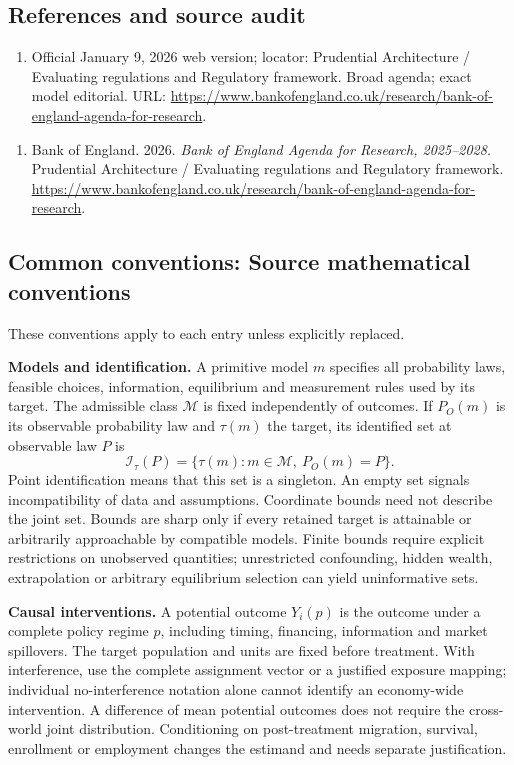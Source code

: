 \documentclass[11pt,a4paper]{article}
\begin{document}
\subsection*{References and source audit}
\begin{enumerate}
\item Official January 9, 2026 web version; locator: Prudential Architecture / Evaluating regulations and Regulatory framework. Broad agenda; exact model editorial. URL: \url{https://www.bankofengland.co.uk/research/bank-of-england-agenda-for-research}.
\end{enumerate}
\begin{enumerate}\raggedright
\item\hypertarget{definitions:source:30007602:1}{} Bank of England. 2026. \emph{Bank of England Agenda for Research, 2025–2028}. Prudential Architecture / Evaluating regulations and Regulatory framework.
\url{https://www.bankofengland.co.uk/research/bank-of-england-agenda-for-research}.
\end{enumerate}

\subsection*{Common conventions: Source mathematical conventions}

These conventions apply to each entry unless explicitly replaced.

\textbf{Models and identification.} A primitive model \(m\) specifies all probability laws, feasible choices, information, equilibrium and measurement rules used by its target. The admissible class \(\mathcal M\) is fixed independently of outcomes. If \(P_O(m)\) is its observable probability law and \(\tau(m)\) the target, its identified set at observable law \(P\) is
\[
 \mathcal I_\tau(P)=\{\tau(m):m\in\mathcal M,\ P_O(m)=P\}.
\]
Point identification means that this set is a singleton. An empty set signals incompatibility of data and assumptions. Coordinate bounds need not describe the joint set. Bounds are sharp only if every retained target is attainable or arbitrarily approachable by compatible models. Finite bounds require explicit restrictions on unobserved quantities; unrestricted confounding, hidden wealth, extrapolation or arbitrary equilibrium selection can yield uninformative sets.

\textbf{Causal interventions.} A potential outcome \(Y_i(p)\) is the outcome under a complete policy regime \(p\), including timing, financing, information and market spillovers. The target population and units are fixed before treatment. With interference, use the complete assignment vector or a justified exposure mapping; individual no-interference notation alone cannot identify an economy-wide intervention. A difference of mean potential outcomes does not require the cross-world joint distribution. Conditioning on post-treatment migration, survival, enrollment or employment changes the estimand and needs separate justification.
\end{document}
